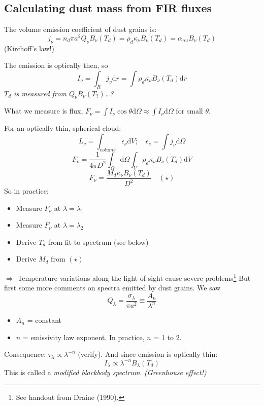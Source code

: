 \documentclass[11pt]{article}
\newcommand{\mar}[1]{\hspace{0pt}\marginpar{-\textcolor{black}{#1}-}}
\newcommand{\mynotes}[1]{{\fontfamily{cmss}\selectfont \textit{#1}}}
\begin{document}
\subsection{Calculating dust mass from FIR fluxes}
The volume emission coefficient of dust grains is:
\[
    j_{\nu}
    = n_{d} \pi a^{2} Q_{\nu} B_{\nu} (T_{d})
    = \rho_{d} \kappa_{\nu} B_{\nu} (T_{d})
    = \alpha_{nu} B_{\nu} (T_{d})
    \]
(Kirchoff's law!)

\mar{107}The emission is optically then, so
\[
    I_{\nu}
    = \int_{R}{
        j_{\nu} \mathrm{d}r}
    = \int{
        \rho_{d} \kappa_{\nu} B_{\nu} (T_{d}) \mathrm{d}r}
    \]
\mynotes{$T_{d}$ is measured from $Q_{\nu}B_{\nu}(T_{?})$\ldots ?}

What we measure is flux,
$F_{\nu} = \int I_{\nu} \cos \theta \mathrm{d}\Omega
\approx \int I_{\nu} \mathrm{d}\Omega $ for small $\theta$.

For an optically thin, spherical cloud:
\[
    L_{\nu} = \int_{volume} \epsilon_{\nu} \mathrm{d}V; \quad
    \epsilon_{\nu} = \int j_{\nu} \mathrm{d}\Omega
    \]
\[
    F_{\nu}
    = \frac{1}{4{\pi}D^{2}} \int_{\Omega}{
        \mathrm{d}\Omega \int_{V}{
            \rho_{d} \kappa_{\nu} B_{\nu} (T_{d}) \mathrm{d}V } }
    \]
\[
    \boxed{
    F_{\nu}
    = \frac{M_{d} \kappa_{\nu} B_{\nu} (T_{d})  }{D^{2}}}
    \quad (\star)
    \]
So in practice:
\begin{itemize}
    \item Measure $F_{\nu}$ at $\lambda = \lambda_{1}$
    \item Measure $F_{\nu}$ at $\lambda = \lambda_{2}$
    \item Derive $T_{d}$ from fit to spectrum (see below)
    \item Derive $M_{d}$ from $(\star)$
\end{itemize}
$\Rightarrow$ Temperature variations along the light of sight cause severe
problems\footnote{See handout from Draine (1990).}
\mar{108}But first some more comments on spectra emitted by dust grains.
We saw
\[
    Q_{\lambda}
    = \frac{\sigma_{\lambda}}{{\pi}a^{2}}
    \equiv \frac{A_{n}}{\lambda^{n}}
    \]
\begin{itemize}
    \item $A_{n}$ = constant
    \item $n$ = emissivity law exponent. In practice, $n$ = 1 to 2.
\end{itemize}
Consequence: $\tau_{\lambda} \propto \lambda^{-n}$
(verify). And since emission is optically thin:
\[
    I_{\lambda} \propto \lambda^{-n} B_{\lambda} (T_{d})
    \]
This is called a \textit{modified blackbody spectrum}.
\mynotes{(Greenhouse effect!)}
\end{document}
